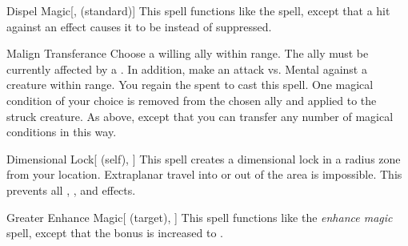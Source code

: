 \lowercase{\hypertarget{spell:Dispel Magic}{}}\label{spell:Dispel Magic}
\begin{apability}[\nth{2}]{\hypertarget{spell:Dispel Magic}{Dispel Magic}}[,  (standard)]
This spell functions like the  spell, except that a hit against an effect causes it to be  instead of suppressed.
\end{apability}
\vspace{0.25em}



\lowercase{\hypertarget{spell:Malign Transferance}{}}\label{spell:Malign Transferance}
\begin{apability}[\nth{2}]{\hypertarget{spell:Malign Transferance}{Malign Transferance}}
Choose a willing ally within \rngmed range.
The ally must be currently affected by a  .
In addition, make an attack vs. Mental against a creature within \rngmed range.
\miss You regain the  spent to cast this spell.
\hit One magical condition of your choice is removed from the chosen ally and applied to the struck creature.
\crit As above, except that you can transfer any number of magical conditions in this way.
\end{apability}
\vspace{0.25em}



\lowercase{\hypertarget{spell:Dimensional Lock}{}}\label{spell:Dimensional Lock}
\begin{attuneability}[\nth{4}]{\hypertarget{spell:Dimensional Lock}{Dimensional Lock}}[ (self), ]
This spell creates a dimensional lock in a \arealarge radius zone from your location.
Extraplanar travel into or out of the area is impossible.
This prevents all , , and  effects.
\end{attuneability}
\vspace{0.25em}



\lowercase{\hypertarget{spell:Greater Enhance Magic}{}}\label{spell:Greater Enhance Magic}
\begin{attuneability}[\nth{4}]{\hypertarget{spell:Greater Enhance Magic}{Greater Enhance Magic}}[ (target), ]
This spell functions like the \textit{enhance magic} spell, except that the bonus is increased to .
\end{attuneability}
\vspace{0.25em}



